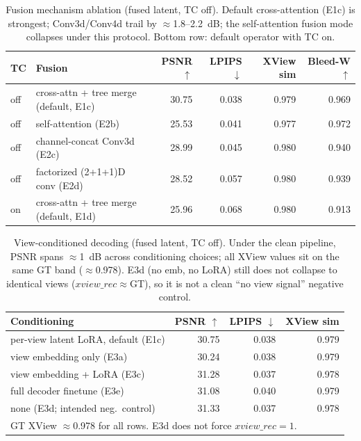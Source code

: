 \begin{table}[t]
\centering
\caption{Fusion mechanism ablation (fused latent, TC off). Default cross-attention (E1c) is strongest; Conv3d/Conv4d trail by $\approx$1.8--2.2~dB; the self-attention fusion mode collapses under this protocol. Bottom row: default operator with TC on.}
\label{tab:fusion}
\begin{tabular}{llrrrr}
\toprule
TC & Fusion & PSNR $\uparrow$ & LPIPS $\downarrow$ & XView sim & Bleed-W $\uparrow$ \\
\midrule
off & cross-attn + tree merge (default, E1c) & 30.75 & 0.038 & 0.979 & 0.969 \\
off & self-attention (E2b)                    & 25.53 & 0.041 & 0.977 & 0.972 \\
off & channel-concat Conv3d (E2c)             & 28.99 & 0.045 & 0.980 & 0.940 \\
off & factorized (2+1+1)D conv (E2d)          & 28.52 & 0.057 & 0.980 & 0.939 \\
\midrule
on  & cross-attn + tree merge (default, E1d) & 25.96 & 0.068 & 0.980 & 0.913 \\
\bottomrule
\end{tabular}
\end{table}

\begin{table}[t]
\centering
\caption{View-conditioned decoding (fused latent, TC off). Under the clean pipeline, PSNR spans $\approx$1~dB across conditioning choices; all XView values sit on the same GT band ($\approx$0.978). E3d (no emb, no LoRA) still does not collapse to identical views ($xview\_rec\approx$GT), so it is not a clean ``no view signal'' negative control.}
\label{tab:viewcond}
\begin{tabular}{lrrr}
\toprule
Conditioning & PSNR $\uparrow$ & LPIPS $\downarrow$ & XView sim \\
\midrule
per-view latent LoRA, default (E1c) & 30.75 & 0.038 & 0.979 \\
view embedding only (E3a)           & 30.24 & 0.038 & 0.979 \\
view embedding + LoRA (E3c)         & 31.28 & 0.037 & 0.978 \\
full decoder finetune (E3e)         & 31.08 & 0.040 & 0.979 \\
none (E3d; intended neg.\ control)  & 31.33 & 0.037 & 0.978 \\
\bottomrule
\multicolumn{4}{l}{\small GT XView $\approx$0.978 for all rows. E3d does not force $xview\_rec{=}1$.}\\
\end{tabular}
\end{table}

